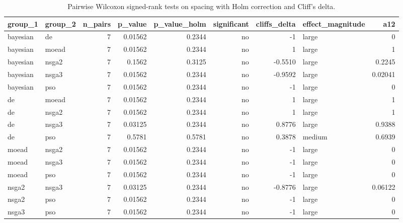 \begin{table}[!t]
\centering
\caption{Pairwise Wilcoxon signed-rank tests on spacing with Holm correction and Cliff's delta.}
\label{tab:statistics_optimizer_pairwise_spacing_main}
\footnotesize
\begin{tabular}{llrrrrrlr}
\toprule
group\_1 & group\_2 & n\_pairs & p\_value & p\_value\_holm & significant & cliffs\_delta & effect\_magnitude & a12 \\
\midrule
bayesian & de & 7 & 0.01562 & 0.2344 & no & -1 & large & 0 \\
bayesian & moead & 7 & 0.01562 & 0.2344 & no & 1 & large & 1 \\
bayesian & nsga2 & 7 & 0.1562 & 0.3125 & no & -0.5510 & large & 0.2245 \\
bayesian & nsga3 & 7 & 0.01562 & 0.2344 & no & -0.9592 & large & 0.02041 \\
bayesian & pso & 7 & 0.01562 & 0.2344 & no & -1 & large & 0 \\
de & moead & 7 & 0.01562 & 0.2344 & no & 1 & large & 1 \\
de & nsga2 & 7 & 0.01562 & 0.2344 & no & 1 & large & 1 \\
de & nsga3 & 7 & 0.03125 & 0.2344 & no & 0.8776 & large & 0.9388 \\
de & pso & 7 & 0.5781 & 0.5781 & no & 0.3878 & medium & 0.6939 \\
moead & nsga2 & 7 & 0.01562 & 0.2344 & no & -1 & large & 0 \\
moead & nsga3 & 7 & 0.01562 & 0.2344 & no & -1 & large & 0 \\
moead & pso & 7 & 0.01562 & 0.2344 & no & -1 & large & 0 \\
nsga2 & nsga3 & 7 & 0.03125 & 0.2344 & no & -0.8776 & large & 0.06122 \\
nsga2 & pso & 7 & 0.01562 & 0.2344 & no & -1 & large & 0 \\
nsga3 & pso & 7 & 0.01562 & 0.2344 & no & -1 & large & 0 \\
\bottomrule
\end{tabular}
\end{table}
